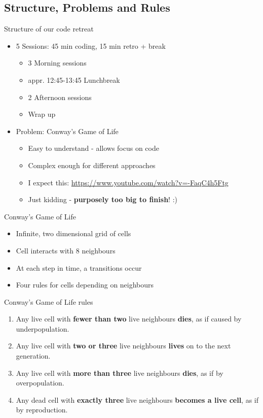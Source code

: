 \documentclass[12pt, xcolor=table, dvipsnames]{beamer}
\begin{document}
\subsection{Structure, Problems and Rules}
\begin{frame}{Structure of our code retreat}
	\begin{itemize}[<+->]
		\item 5 Sessions: 45 min coding, 15 min retro + break
			\begin{itemize}[<+->]
				\item 3 Morning sessions
				\item appr. 12:45-13:45 Lunchbreak 
				\item 2 Afternoon sessions
				\item Wrap up
			\end{itemize}  
		\item Problem: Conway's Game of Life
			\begin{itemize}[<+->]
				\item Easy to understand - allows focus on code
				\item Complex enough for different approaches
				\item I expect this: \url{https://www.youtube.com/watch?v=-FaqC4h5Ftg}
				\item Just kidding - \textbf{purposely too big to finish}! :)
			\end{itemize}  
	\end{itemize}  
\end{frame}

\begin{frame}{Conway's Game of Life}
\pause
	\begin{itemize}[<+->]
		\item Infinite, two dimensional grid of cells
		\item Cell interacts with 8 neighbours
		\item At each step in time, a transitions occur
		\item Four rules for cells depending on neighbours
	\end{itemize}  
\end{frame}

\begin{frame}{Conway's Game of Life rules}
\pause
	\begin{enumerate}[<+->]
	  \item Any live cell with \textbf{fewer than two} live neighbours \textbf{dies}, as if caused by underpopulation.
      \item Any live cell with \textbf{two or three} live neighbours \textbf{lives} on to the next generation.		
	  \item Any live cell with \textbf{more than three} live neighbours \textbf{dies}, as if by overpopulation.		
	  \item Any dead cell with \textbf{exactly three} live neighbours \textbf{becomes a live cell}, as if by reproduction.
	\end{enumerate}
\end{frame}
\end{document}
